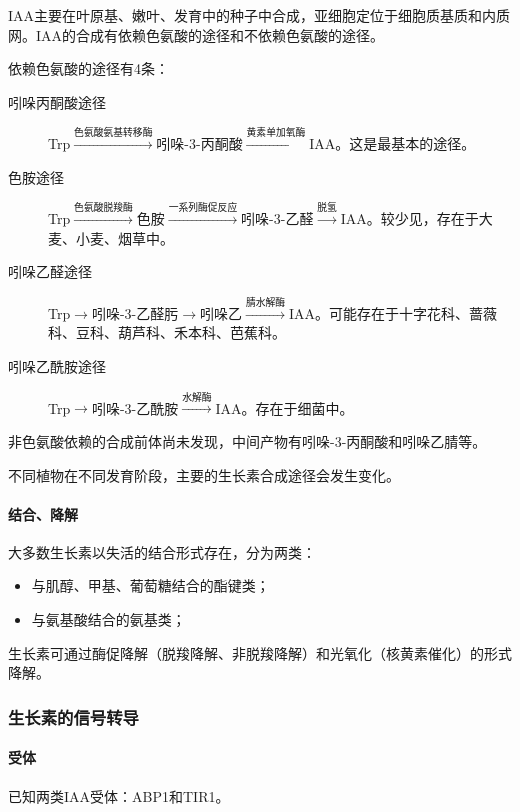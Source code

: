IAA主要在叶原基、嫩叶、发育中的种子中合成，亚细胞定位于细胞质基质和内质网。IAA的合成有依赖色氨酸的途径和不依赖色氨酸的途径。

依赖色氨酸的途径有4条：

\begin{description}
	\item[吲哚丙酮酸途径] Trp$\xrightarrow{\text{色氨酸氨基转移酶}}$吲哚-3-丙酮酸$\xrightarrow{\text{黄素单加氧酶}}$IAA。这是最基本的途径。
	\item[色胺途径] Trp$\xrightarrow{\text{色氨酸脱羧酶}}$色胺$\xrightarrow{\text{一系列酶促反应}}$吲哚-3-乙醛$\xrightarrow{\text{脱氢}}$IAA。较少见，存在于大麦、小麦、烟草中。
	\item[吲哚乙醛途径] Trp$\longrightarrow$吲哚-3-乙醛肟$\longrightarrow$吲哚乙$\xrightarrow{\text{腈水解酶}}$IAA。可能存在于十字花科、蔷薇科、豆科、葫芦科、禾本科、芭蕉科。
	\item[吲哚乙酰胺途径] Trp$\longrightarrow$吲哚-3-乙酰胺$\xrightarrow{\text{水解酶}}$IAA。存在于细菌中。
\end{description}

非色氨酸依赖的合成前体尚未发现，中间产物有吲哚-3-丙酮酸和吲哚乙腈等。

不同植物在不同发育阶段，主要的生长素合成途径会发生变化。

\paragraph{结合、降解}

大多数生长素以失活的结合形式存在，分为两类：

\begin{itemize}
	\item 与肌醇、甲基、葡萄糖结合的酯键类；
	\item 与氨基酸结合的氨基类；
\end{itemize}

生长素可通过酶促降解（脱羧降解、非脱羧降解）和光氧化（核黄素催化）的形式降解。

\subsubsection{生长素的信号转导}

\paragraph{受体}

已知两类IAA受体：ABP1和TIR1。

